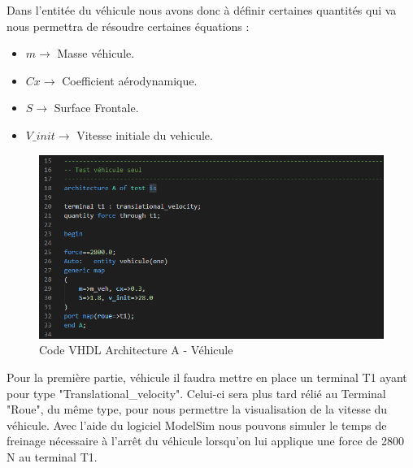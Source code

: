Dans l'entitée du véhicule nous avons donc à définir certaines quantités qui va nous permettra de résoudre certaines équations :\\

\begin{itemize}
        \item $m        \rightarrow$ Masse véhicule.
        \item $Cx       \rightarrow$ Coefficient aérodynamique.
        \item $S        \rightarrow$ Surface Frontale.
        \item $V\_init  \rightarrow$ Vitesse initiale du vehicule.
\end{itemize}

\begin{figure}[h]
    \centering
    \includegraphics[width=\textwidth]{images/vehicule.png}
    \caption{Code VHDL Architecture A - Véhicule}
\end{figure}

Pour la première partie, véhicule il faudra mettre en place un terminal T1 ayant pour type "Translational\_velocity". Celui-ci sera plus tard rélié au Terminal "Roue", du même type, pour nous permettre la visualisation de la vitesse du véhicule.
\newpage
Avec l'aide du logiciel ModelSim nous pouvons simuler le temps de freinage nécessaire à l'arrêt du véhicule lorsqu'on lui applique une force de 2800 N au terminal T1.

